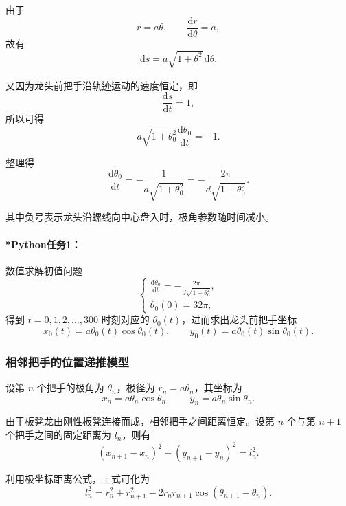 \documentclass[12pt,a4paper]{ctexart}
\begin{document}
由于
\[
r=a\theta,\qquad \frac{\mathrm{d}r}{\mathrm{d}\theta}=a,
\]
故有
\begin{equation}
\mathrm{d}s=a\sqrt{1+\theta^2}\,\mathrm{d}\theta.
\end{equation}

又因为龙头前把手沿轨迹运动的速度恒定，即
\begin{equation}
\frac{\mathrm{d}s}{\mathrm{d}t}=1,
\end{equation}
所以可得
\begin{equation}
a\sqrt{1+\theta_0^2}\frac{\mathrm{d}\theta_0}{\mathrm{d}t}=-1.
\end{equation}

整理得
\begin{equation}
\frac{\mathrm{d}\theta_0}{\mathrm{d}t}
=-\frac{1}{a\sqrt{1+\theta_0^2}}
=-\frac{2\pi}{d\sqrt{1+\theta_0^2}}.
\end{equation}

其中负号表示龙头沿螺线向中心盘入时，极角参数随时间减小。

\paragraph{*Python任务1：}
数值求解初值问题
\[
\begin{cases}
\displaystyle \frac{\mathrm{d}\theta_0}{\mathrm{d}t}
=-\frac{2\pi}{d\sqrt{1+\theta_0^2}},\\[0.8em]
\theta_0(0)=32\pi,
\end{cases}
\]
得到 $t=0,1,2,\dots,300$ 时刻对应的 $\theta_0(t)$，进而求出龙头前把手坐标
\[
x_0(t)=a\theta_0(t)\cos\theta_0(t),\qquad
y_0(t)=a\theta_0(t)\sin\theta_0(t).
\]

\subsubsection{相邻把手的位置递推模型}
设第 $n$ 个把手的极角为 $\theta_n$，极径为 $r_n=a\theta_n$，其坐标为
\begin{equation}
x_n=a\theta_n\cos\theta_n,\qquad
y_n=a\theta_n\sin\theta_n.
\end{equation}

由于板凳龙由刚性板凳连接而成，相邻把手之间距离恒定。设第 $n$ 个与第 $n+1$ 个把手之间的固定距离为 $l_n$，则有
\begin{equation}
(x_{n+1}-x_n)^2+(y_{n+1}-y_n)^2=l_n^2.
\end{equation}

利用极坐标距离公式，上式可化为
\begin{equation}
l_n^2=r_n^2+r_{n+1}^2-2r_nr_{n+1}\cos(\theta_{n+1}-\theta_n).
\end{equation}
\end{document}
